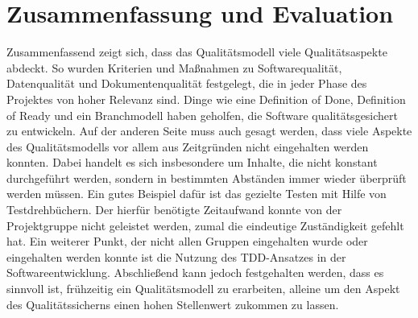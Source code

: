 \section{Zusammenfassung und Evaluation}
Zusammenfassend zeigt sich, dass das Qualitätsmodell viele Qualitätsaspekte abdeckt. 
So wurden Kriterien und Maßnahmen zu Softwarequalität, Datenqualität und Dokumentenqualität festgelegt, die in jeder Phase des Projektes von hoher Relevanz sind. 
Dinge wie eine Definition of Done, Definition of Ready und ein Branchmodell haben geholfen, die Software qualitätsgesichert zu entwickeln. 
Auf der anderen Seite muss auch gesagt werden, dass viele Aspekte des Qualitätsmodells vor allem aus Zeitgründen nicht eingehalten werden konnten. Dabei handelt es sich insbesondere um Inhalte, die nicht konstant durchgeführt werden, sondern in bestimmten Abständen immer wieder überprüft werden müssen. Ein gutes Beispiel dafür ist das gezielte Testen mit Hilfe von Testdrehbüchern. Der hierfür benötigte Zeitaufwand konnte von der Projektgruppe nicht geleistet werden, zumal die eindeutige Zuständigkeit gefehlt hat. Ein weiterer Punkt, der nicht allen Gruppen eingehalten wurde oder eingehalten werden konnte ist die Nutzung des TDD-Ansatzes in der Softwareentwicklung. 
Abschließend kann jedoch festgehalten werden, dass es sinnvoll ist, frühzeitig ein Qualitätsmodell zu erarbeiten, alleine um den Aspekt des Qualitätssicherns einen hohen Stellenwert zukommen zu lassen. 